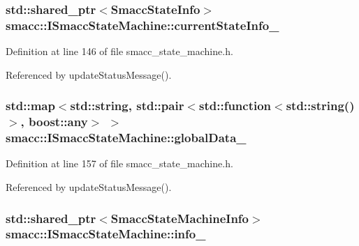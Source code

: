 \subsubsection[{\texorpdfstring{current\+State\+Info\+\_\+}{currentStateInfo_}}]{\setlength{\rightskip}{0pt plus 5cm}std\+::shared\+\_\+ptr$<${\bf Smacc\+State\+Info}$>$ smacc\+::\+I\+Smacc\+State\+Machine\+::current\+State\+Info\+\_\+\hspace{0.3cm}{\ttfamily [protected]}}\hypertarget{classsmacc_1_1ISmaccStateMachine_a95e42f735cecdc231ad5372bf9fe7eaf}{}\label{classsmacc_1_1ISmaccStateMachine_a95e42f735cecdc231ad5372bf9fe7eaf}


Definition at line 146 of file smacc\+\_\+state\+\_\+machine.\+h.



Referenced by update\+Status\+Message().

\subsubsection[{\texorpdfstring{global\+Data\+\_\+}{globalData_}}]{\setlength{\rightskip}{0pt plus 5cm}std\+::map$<$std\+::string, std\+::pair$<$std\+::function$<$std\+::string()$>$, boost\+::any$>$ $>$ smacc\+::\+I\+Smacc\+State\+Machine\+::global\+Data\+\_\+\hspace{0.3cm}{\ttfamily [private]}}\hypertarget{classsmacc_1_1ISmaccStateMachine_ad2f9dae184ea942db632ac4532a10a91}{}\label{classsmacc_1_1ISmaccStateMachine_ad2f9dae184ea942db632ac4532a10a91}


Definition at line 157 of file smacc\+\_\+state\+\_\+machine.\+h.



Referenced by update\+Status\+Message().

\subsubsection[{\texorpdfstring{info\+\_\+}{info_}}]{\setlength{\rightskip}{0pt plus 5cm}std\+::shared\+\_\+ptr$<${\bf Smacc\+State\+Machine\+Info}$>$ smacc\+::\+I\+Smacc\+State\+Machine\+::info\+\_\+}\hypertarget{classsmacc_1_1ISmaccStateMachine_a5ec3201cbddab4f062f572fb33021041}{}\label{classsmacc_1_1ISmaccStateMachine_a5ec3201cbddab4f062f572fb33021041}


